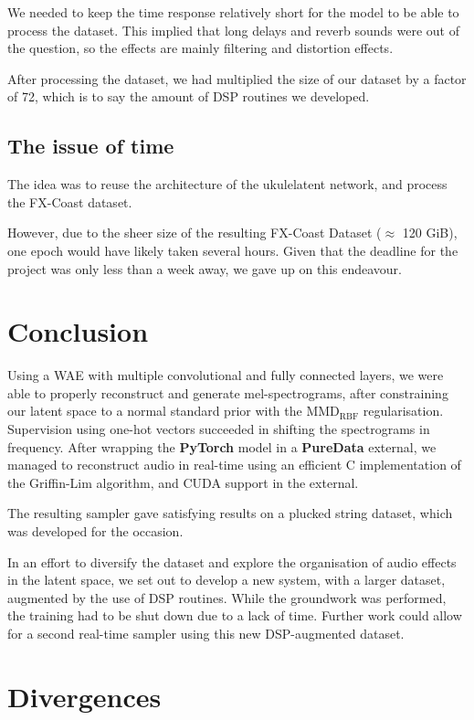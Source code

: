 \documentclass[11pt, english]{article}
\begin{document}
We needed to keep the time response relatively short for the model to be able to process the dataset. This implied that long delays and reverb sounds were out of the question, so the effects are mainly filtering and distortion effects.

After processing the dataset, we had multiplied the size of our dataset by a factor of 72, which is to say the amount of DSP routines we developed.

\subsection{The issue of time}
The idea was to reuse the architecture of the ukulelatent network, and process the FX-Coast dataset.

However, due to the sheer size of the resulting FX-Coast Dataset ($\approx$ 120 GiB), one epoch would have likely taken several hours. Given that the deadline for the project was only less than a week away, we gave up on this endeavour.

\section*{Conclusion}

Using a WAE with multiple convolutional and fully connected layers, we were able to properly reconstruct and generate mel-spectrograms, after constraining our latent space to a normal standard prior with the $\text{MMD}_\text{RBF}$ regularisation. Supervision using one-hot vectors succeeded in shifting the spectrograms in frequency.
After wrapping the \textbf{PyTorch} model in a \textbf{PureData} external, we managed to reconstruct audio in real-time using an efficient C implementation of the Griffin-Lim algorithm, and CUDA support in the external.

The resulting sampler gave satisfying results on a plucked string dataset, which was developed for the occasion.

In an effort to diversify the dataset and explore the organisation of audio effects in the latent space, we set out to develop a new system, with a larger dataset, augmented by the use of DSP routines. While the groundwork was performed, the training had to be shut down due to a lack of time. Further work could allow for a second real-time sampler using this new DSP-augmented dataset.




\newpage
\appendix
\section{Divergences}
\label{sec:appendix}
\end{document}

